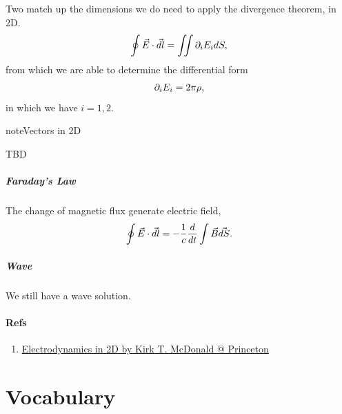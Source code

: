 \documentclass[letterpaper,10pt,english]{sphinxmanual}
\begin{document}
Two match up the dimensions we do need to apply the divergence theorem, in 2D.
\begin{gather}
\begin{split}\oint \vec E\cdot \vec {dl} = \iint \partial_i E_i dS,\end{split}\notag
\end{gather}
from which we are able to determine the differential form
\begin{gather}
\begin{split}\partial_i E_i = 2\pi\rho,\end{split}\notag
\end{gather}
in which we have \(i=1,2\).

\begin{notice}{note}{Vectors in 2D}

TBD
\end{notice}


\paragraph{Faraday's Law}
\label{fun:faraday-s-law}
The change of magnetic flux generate electric field,
\begin{gather}
\begin{split}\oint \vec E \cdot \vec{dl}  =  -\frac{1}{c} \frac{d}{dt} \int \vec B \vec{dS}.\end{split}\notag
\end{gather}

\paragraph{Wave}
\label{fun:wave}
We still have a wave solution.


\subsubsection{Refs}
\label{fun:refs}\begin{enumerate}
\item {} 
\href{http://www.hep.princeton.edu/~mcdonald/examples/2dem.pdf}{Electrodynamics in 2D by Kirk T. McDonald @ Princeton}

\end{enumerate}


\chapter{Vocabulary}
\label{index:vocabulary}
\end{document}
